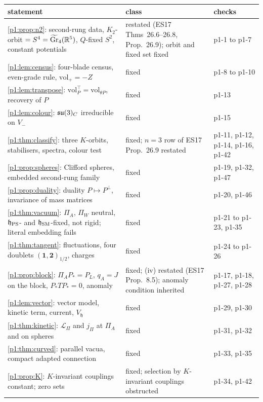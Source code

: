 \begin{table}[t]
\centering
\footnotesize
\begin{tabular}{@{}>{\raggedright\arraybackslash}p{8.4cm}>{\raggedright\arraybackslash}p{4.3cm}>{\raggedright\arraybackslash}p{2.2cm}@{}}
\toprule
statement & class & checks\\
\midrule
\cref{p1:prop:n2}: second-rung data, $K_2$-orbit $=S^4=\widetilde{\mathrm{Gr}}_4(\mathbb{R}^5)$, $Q$-fixed $S^2$, constant potentials & restated (ES17 Thms~26.6--26.8, Prop.~26.9); orbit and fixed set fixed & p1-1 to p1-7\\
\cref{p1:lem:census}: four-blade census, even-grade rule, $\mathrm{vol}_+=-Z$ & fixed & p1-8 to p1-10\\
\cref{p1:lem:transpose}: $\mathrm{vol}_P^{\!\top}=\mathrm{vol}_{\theta P}$, recovery of $P$ & fixed & p1-13\\
\cref{p1:lem:colour}: $\mathfrak{su}(3)_C$ irreducible on $V_-$ & fixed & p1-15\\
\cref{p1:thm:classify}: three $K$-orbits, stabilisers, spectra, colour test & fixed; $n=3$ row of ES17 Prop.~26.9 restated & p1-11, p1-12, p1-14, p1-16, p1-42\\
\cref{p1:prop:spheres}: Clifford spheres, embedded second-rung family & fixed & p1-19, p1-32, p1-47\\
\cref{p1:prop:duality}: duality $P\mapsto P^\perp$, invariance of mass matrices & fixed & p1-20, p1-46\\
\cref{p1:thm:vacuum}: $\Pi_A$, $\Pi_W$ neutral, $\mathfrak h_{\rm PS}$- and $\mathfrak h_{\rm SM}$-fixed, not rigid; literal embedding fails & fixed & p1-21 to p1-23, p1-35\\
\cref{p1:thm:tangent}: fluctuations, four doublets $(\mathbf1,\mathbf2)_{1/2}$, charges & fixed & p1-24 to p1-26\\
\cref{p1:prop:block}: $\Pi_AP_*=P_L$, $q_A=J$ on the block, $P_*TP_*=0$, anomaly & fixed; (iv) restated (ES17 Prop.~8.5); anomaly condition inherited & p1-17, p1-18, p1-27, p1-28\\
\cref{p1:lem:vector}: vector model, kinetic term, current, $V_{\mathfrak h}$ & fixed & p1-29, p1-30\\
\cref{p1:thm:kinetic}: $\mathcal L_\Pi$ and $j_\Pi$ at $\Pi_A$ and on spheres & fixed & p1-31, p1-32\\
\cref{p1:thm:curved}: parallel vacua, compact adapted connection & fixed & p1-33, p1-35\\
\cref{p1:prop:K}: $K$-invariant couplings constant; zero sets & fixed; selection by $K$-invariant couplings obstructed & p1-34, p1-42\\

\end{tabular}
\end{table}
